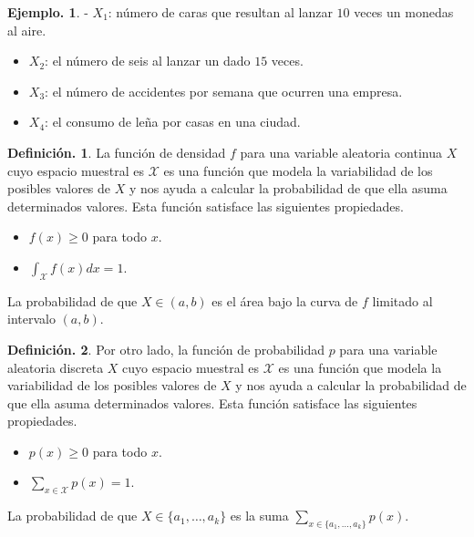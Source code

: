 \documentclass[]{book}
\providecommand{\tightlist}{%
  \setlength{\itemsep}{0pt}\setlength{\parskip}{0pt}}
\theoremstyle{definition}
\newtheorem{definition}{Definición.}[chapter]
\theoremstyle{definition}
\newtheorem{example}{Ejemplo.}[chapter]
\theoremstyle{definition}
\theoremstyle{remark}
\begin{document}
\begin{example}
\protect\hypertarget{exm:unnamed-chunk-101}{}{\label{exm:unnamed-chunk-101} }
- \(X_1\): número de caras que resultan al lanzar \(10\) veces un
monedas al aire.

\begin{itemize}
\item
  \(X_2\): el número de seis al lanzar un dado \(15\) veces.
\item
  \(X_3\): el número de accidentes por semana que ocurren una
  empresa.
\item
  \(X_4\): el consumo de leña por casas en una ciudad.
\end{itemize}
\end{example}

\begin{definition}
\protect\hypertarget{def:unnamed-chunk-102}{}{\label{def:unnamed-chunk-102} }
La función de densidad \(f\) para una variable aleatoria
continua \(X\) cuyo espacio muestral es \(\mathcal{X}\) es
una función que modela la variabilidad de los posibles
valores de \(X\) y nos ayuda a calcular la probabilidad de
que ella asuma determinados valores. Esta función
satisface las siguientes propiedades.

\begin{itemize}
\tightlist
\item
  \(f(x)\geq 0\) para todo \(x\).
\item
  \(\int_{\mathcal{X}}f(x)dx=1\).
\end{itemize}

La probabilidad de que \(X\in (a,b)\) es el área bajo la
curva de \(f\) limitado al intervalo \((a,b)\).
\end{definition}

\begin{definition}
\protect\hypertarget{def:unnamed-chunk-103}{}{\label{def:unnamed-chunk-103} }
Por otro lado, la función de probabilidad \(p\) para una
variable aleatoria discreta \(X\) cuyo espacio muestral es
\(\mathcal{X}\) es una función que modela la variabilidad
de los posibles valores de \(X\) y nos ayuda a calcular la
probabilidad de que ella asuma determinados valores.
Esta función satisface las siguientes propiedades.

\begin{itemize}
\tightlist
\item
  \(p(x)\geq 0\) para todo \(x\).
\item
  \(\sum_{x\in \mathcal{X}}p(x)=1\).
\end{itemize}

La probabilidad de que \(X\in \{a_1, \ldots, a_k \}\) es
la suma \(\sum_{x \in \{a_1, \ldots, a_k \}}p(x)\).
\end{definition}
\end{document}
